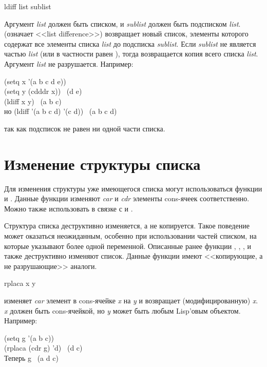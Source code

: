 \begin{defun}[Функция]
ldiff list sublist

Аргумент \emph{list} должен быть списком, и \emph{sublist} должен быть
подсписком \emph{list}.
 (означает <<list difference>>) возвращает новый список, элементы
которого содержат все элементы списка \emph{list} до подсписка
\emph{sublist}. Если \emph{sublist} не является частью \emph{list} (или в
частности равен {\nil}), тогда возвращается копия всего списка \emph{list}.
Аргумент \emph{list} не разрушается.
Например:
\begin{lisp}
(setq x '(a b c d e)) \\
(setq y (cdddr x)) \EV\ (d e) \\
(ldiff x y) \EV\ (a b c) \\[4pt]
\textrm{но} (ldiff '(a b c d) '(c d)) \EV\ (a b c d)
\end{lisp}
так как подсписок не равен  ни одной части списка.
\end{defun}

\section{Изменение структуры списка}

Для изменения структуры уже имеющегося списка могут использоваться функции
 и . Данные функции изменяют \emph{car} и \emph{cdr}
элементы cons-ячеек соответственно.
Можно также использовать  в связке с  и .

Структура списка деструктивно изменяется, а не копируется. Такое поведение может
оказаться неожиданным, особенно при использовании частей списком, на которые
указывают более одной переменной.
Описанные ранее функции , , ,
и  также деструктивно изменяют список.
Данные функции имеют <<копирующие, а не разрушающие>> аналоги.

\begin{defun}[Функция]
rplaca x y

 изменяет \emph{car} элемент в cons-ячейке
\emph{x} на \emph{y} и возвращает (модифицированную) \emph{x}. \emph{x} должен
быть cons-ячейкой, но \emph{y} может быть любым Lisp'овым объектом.
Например:
\begin{lisp}
(setq g '(a b c)) \\
(rplaca (cdr g) 'd) \EV\ (d c) \\
\textrm{Теперь} g \EV\ (a d c)
\end{lisp}
\end{defun}

